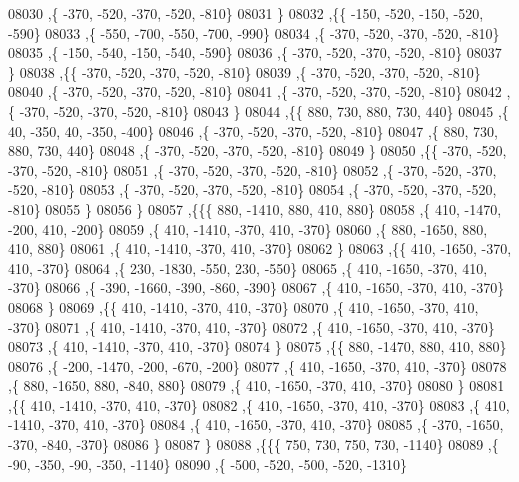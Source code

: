 \begin{DoxyCode}
08030     ,\{  -370,  -520,  -370,  -520,  -810\}
08031     \}
08032    ,\{\{  -150,  -520,  -150,  -520,  -590\}
08033     ,\{  -550,  -700,  -550,  -700,  -990\}
08034     ,\{  -370,  -520,  -370,  -520,  -810\}
08035     ,\{  -150,  -540,  -150,  -540,  -590\}
08036     ,\{  -370,  -520,  -370,  -520,  -810\}
08037     \}
08038    ,\{\{  -370,  -520,  -370,  -520,  -810\}
08039     ,\{  -370,  -520,  -370,  -520,  -810\}
08040     ,\{  -370,  -520,  -370,  -520,  -810\}
08041     ,\{  -370,  -520,  -370,  -520,  -810\}
08042     ,\{  -370,  -520,  -370,  -520,  -810\}
08043     \}
08044    ,\{\{   880,   730,   880,   730,   440\}
08045     ,\{    40,  -350,    40,  -350,  -400\}
08046     ,\{  -370,  -520,  -370,  -520,  -810\}
08047     ,\{   880,   730,   880,   730,   440\}
08048     ,\{  -370,  -520,  -370,  -520,  -810\}
08049     \}
08050    ,\{\{  -370,  -520,  -370,  -520,  -810\}
08051     ,\{  -370,  -520,  -370,  -520,  -810\}
08052     ,\{  -370,  -520,  -370,  -520,  -810\}
08053     ,\{  -370,  -520,  -370,  -520,  -810\}
08054     ,\{  -370,  -520,  -370,  -520,  -810\}
08055     \}
08056    \}
08057   ,\{\{\{   880, -1410,   880,   410,   880\}
08058     ,\{   410, -1470,  -200,   410,  -200\}
08059     ,\{   410, -1410,  -370,   410,  -370\}
08060     ,\{   880, -1650,   880,   410,   880\}
08061     ,\{   410, -1410,  -370,   410,  -370\}
08062     \}
08063    ,\{\{   410, -1650,  -370,   410,  -370\}
08064     ,\{   230, -1830,  -550,   230,  -550\}
08065     ,\{   410, -1650,  -370,   410,  -370\}
08066     ,\{  -390, -1660,  -390,  -860,  -390\}
08067     ,\{   410, -1650,  -370,   410,  -370\}
08068     \}
08069    ,\{\{   410, -1410,  -370,   410,  -370\}
08070     ,\{   410, -1650,  -370,   410,  -370\}
08071     ,\{   410, -1410,  -370,   410,  -370\}
08072     ,\{   410, -1650,  -370,   410,  -370\}
08073     ,\{   410, -1410,  -370,   410,  -370\}
08074     \}
08075    ,\{\{   880, -1470,   880,   410,   880\}
08076     ,\{  -200, -1470,  -200,  -670,  -200\}
08077     ,\{   410, -1650,  -370,   410,  -370\}
08078     ,\{   880, -1650,   880,  -840,   880\}
08079     ,\{   410, -1650,  -370,   410,  -370\}
08080     \}
08081    ,\{\{   410, -1410,  -370,   410,  -370\}
08082     ,\{   410, -1650,  -370,   410,  -370\}
08083     ,\{   410, -1410,  -370,   410,  -370\}
08084     ,\{   410, -1650,  -370,   410,  -370\}
08085     ,\{  -370, -1650,  -370,  -840,  -370\}
08086     \}
08087    \}
08088   ,\{\{\{   750,   730,   750,   730, -1140\}
08089     ,\{   -90,  -350,   -90,  -350, -1140\}
08090     ,\{  -500,  -520,  -500,  -520, -1310\}

\end{DoxyCode}
